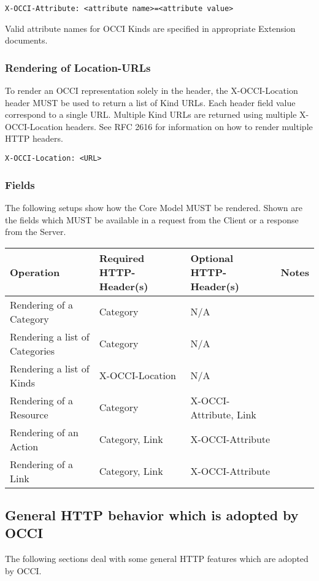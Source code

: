 \documentclass[10pt,a4paper]{article}
\begin{document}
\begin{verbatim}
X-OCCI-Attribute: <attribute name>=<attribute value>
\end{verbatim}

Valid attribute names for OCCI Kinds are specified in appropriate
Extension documents.

\subsubsection{Rendering of Location-URLs}
To render an OCCI representation solely in the header, the
X-OCCI-Location header MUST be used to return a list of Kind
URLs. Each header field value correspond to a single URL. Multiple
Kind URLs are returned using multiple X-OCCI-Location headers. See RFC
2616 for information on how to render multiple HTTP headers.

\begin{verbatim}
X-OCCI-Location: <URL>
\end{verbatim}

\subsubsection{Fields}
The following setups show how the Core Model MUST be rendered. Shown
are the fields which MUST be available in a request from the Client or
a response from the Server.

\begin{tabular}{l|l|l|l}
Operation & Required HTTP-Header(s) & Optional HTTP-Header(s) & Notes \\
\hline
Rendering of a Category & Category & N/A & \\
Rendering a list of Categories & Category & N/A & \\
Rendering a list of Kinds & X-OCCI-Location & N/A & \\
Rendering of a Resource & Category & X-OCCI-Attribute, Link & \\
Rendering of an Action & Category, Link & X-OCCI-Attribute & \\
Rendering of a Link & Category, Link & X-OCCI-Attribute & \\
\end{tabular}

\subsection{General HTTP behavior which is adopted by OCCI}
The following sections deal with some general HTTP features which are
adopted by OCCI.
\end{document}
